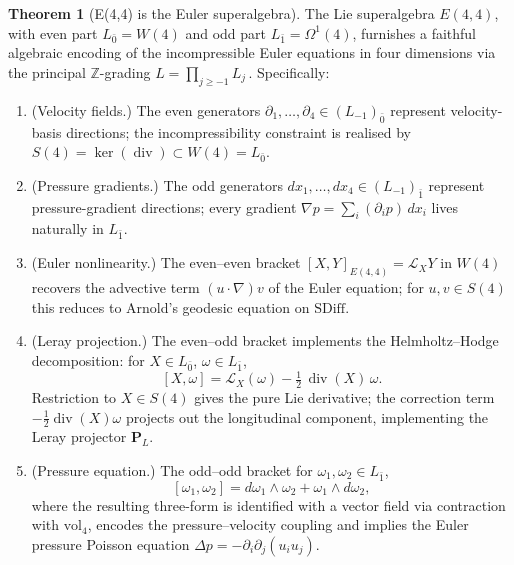 \documentclass[reqno,10pt]{amsart}
\theoremstyle{definition}
\newtheorem{theor}[subsubsection]{Theorem}
\def\Wn{W(4)}
\def\Sn{S(4)}
\def\divX{{\operatorname{div}}}
\begin{document}
\begin{theor}[E(4,4) is the Euler superalgebra]\label{thm:ns-e44}
The Lie superalgebra $E(4,4)$, with even part $L_{\bar 0} = \Wn$ and odd part
$L_{\bar 1} = \Omega^1(4)$, furnishes a faithful algebraic encoding of the
incompressible Euler equations in four dimensions via the principal
$\mathbb{Z}$-grading $L = \prod_{j\geq -1}L_j$\,.  Specifically:
\begin{enumerate}
\item[(i)] \textup{(Velocity fields.)}
The even generators $\partial_1,\ldots,\partial_4\in(L_{-1})_{\bar 0}$ represent
velocity-basis directions; the incompressibility constraint is realised by
$\Sn = \ker(\divX)\subset\Wn = L_{\bar 0}$.

\item[(ii)] \textup{(Pressure gradients.)}
The odd generators $dx_1,\ldots,dx_4\in(L_{-1})_{\bar 1}$ represent
pressure-gradient directions; every gradient $\nabla p = \sum_i(\partial_i p)\,dx_i$
lives naturally in $L_{\bar 1}$.

\item[(iii)] \textup{(Euler nonlinearity.)}
The even--even bracket $[X,Y]_{E(4,4)} = \mathcal{L}_X Y$ in $\Wn$ recovers the
advective term $(u\cdot\nabla)v$ of the Euler equation; for $u,v\in\Sn$ this
reduces to Arnold's geodesic equation on $\mathrm{SDiff}$.

\item[(iv)] \textup{(Leray projection.)}
The even--odd bracket implements the Helmholtz--Hodge decomposition:
for $X\in L_{\bar 0}$, $\omega\in L_{\bar 1}$,
\begin{equation}\label{eq:mixed-bracket}
  [X,\omega] = \mathcal{L}_X(\omega) - \tfrac{1}{2}\,\divX(X)\,\omega.
\end{equation}
Restriction to $X\in\Sn$ gives the pure Lie derivative; the correction term
$-\tfrac{1}{2}\divX(X)\omega$ projects out the longitudinal component,
implementing the Leray projector $\mathbf{P}_L$.

\item[(v)] \textup{(Pressure equation.)}
The odd--odd bracket for $\omega_1,\omega_2\in L_{\bar 1}$,
\begin{equation}\label{eq:odd-bracket}
  [\omega_1,\omega_2] = d\omega_1\wedge\omega_2 + \omega_1\wedge d\omega_2,
\end{equation}
where the resulting three-form is identified with a vector field via contraction
with $\mathrm{vol}_4$, encodes the pressure--velocity coupling and implies
the Euler pressure Poisson equation $\Delta p = -\partial_i\partial_j(u_i u_j)$.


\end{enumerate}
\end{theor}
\end{document}
